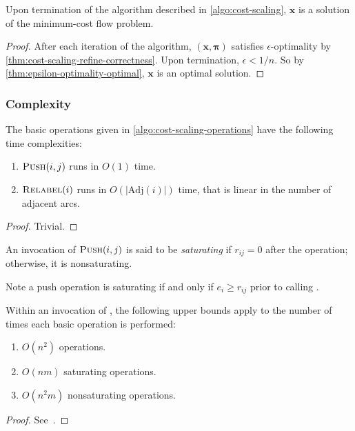 \begin{cor}
Upon termination of the algorithm described in \cref{algo:cost-scaling}, $\mathbf{x}$ is a solution of the minimum-cost flow problem.  
\end{cor}
\begin{proof}
After each iteration of the algorithm, $\left(\mathbf{x},\boldsymbol{\pi}\right)$ satisfies $\epsilon$-optimality by \cref{thm:cost-scaling-refine-correctness}. Upon termination, $\epsilon < 1/n$. So by \cref{thm:epsilon-optimality-optimal}, $\mathbf{x}$ is an optimal solution.
\end{proof}

\subsubsection{Complexity}

\begin{lemma} \label{lemma:cost-scaling-operations-complexity}
The basic operations given in \cref{algo:cost-scaling-operations} have the following time complexities:
\begin{enumerate}[label=(\alph*)]
    \item $\textproc{Push}(i,j)$ runs in $O(1)$ time.
    \item $\textproc{Relabel}(i)$ runs in $O\left(\left|\mathrm{Adj}(i)\right|\right)$ time, that is linear in the number of adjacent arcs.
\end{enumerate}
\end{lemma}
\begin{proof}
Trivial.
\end{proof}

\begin{defn}
An invocation of $\textproc{Push}(i,j)$ is said to be \emph{saturating} if $r_{ij} = 0$ after the operation; otherwise, it is nonsaturating.\\
\end{defn}

\begin{remark}
Note a push operation is saturating if and only if $e_i \geq r_{ij}$ prior to calling .\\
\end{remark}

\begin{lemma} \label{lemma:cost-scaling-number-operations}
Within an invocation of , the following upper bounds apply to the number of times each basic operation is performed:
\begin{enumerate}[label=(\alph*)]
    \item $O(n^2)$  operations.
    \item $O(nm)$ saturating  operations.
    \item $O(n^2m)$ nonsaturating  operations.
\end{enumerate}
\end{lemma}
\begin{proof}
See~\cite[lemma~6.3, lemma~6.4, lemma~6.7]{Goldberg:1987}.
\end{proof}

